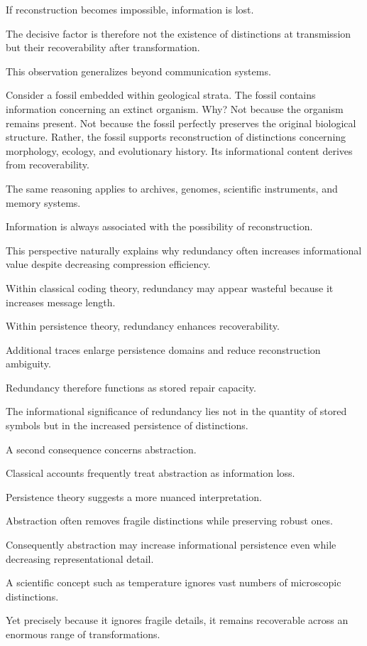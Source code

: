 \documentclass[12pt,oneside]{article}
\theoremstyle{definition}
\begin{document}
If reconstruction becomes impossible, information is lost.

The decisive factor is therefore not the existence of distinctions at transmission but their recoverability after transformation.

This observation generalizes beyond communication systems.

Consider a fossil embedded within geological strata. The fossil contains information concerning an extinct organism. Why? Not because the organism remains present. Not because the fossil perfectly preserves the original biological structure. Rather, the fossil supports reconstruction of distinctions concerning morphology, ecology, and evolutionary history. Its informational content derives from recoverability.

The same reasoning applies to archives, genomes, scientific instruments, and memory systems.

Information is always associated with the possibility of reconstruction.

This perspective naturally explains why redundancy often increases informational value despite decreasing compression efficiency.

Within classical coding theory, redundancy may appear wasteful because it increases message length.

Within persistence theory, redundancy enhances recoverability.

Additional traces enlarge persistence domains and reduce reconstruction ambiguity.

Redundancy therefore functions as stored repair capacity.

The informational significance of redundancy lies not in the quantity of stored symbols but in the increased persistence of distinctions.

A second consequence concerns abstraction.

Classical accounts frequently treat abstraction as information loss.

Persistence theory suggests a more nuanced interpretation.

Abstraction often removes fragile distinctions while preserving robust ones.

Consequently abstraction may increase informational persistence even while decreasing representational detail.

A scientific concept such as temperature ignores vast numbers of microscopic distinctions.

Yet precisely because it ignores fragile details, it remains recoverable across an enormous range of transformations.
\end{document}
